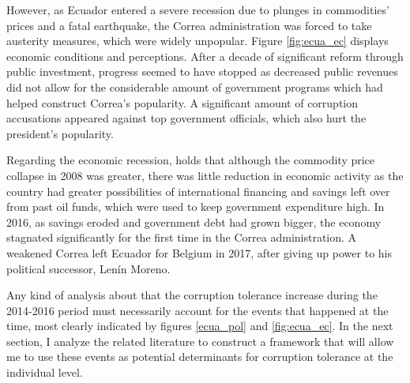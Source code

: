 \documentclass[12pt,a4]{article}\usepackage[]{graphicx}\usepackage[]{xcolor}
\begin{document}
However, as Ecuador entered a severe recession due to plunges in commodities’ prices and a fatal earthquake, the Correa administration was forced to take austerity measures, which were widely unpopular. Figure \ref{fig:ecua_ec} displays economic conditions and perceptions. After a decade of significant reform through public investment, progress seemed to have stopped as decreased public revenues did not allow for the considerable amount of government programs which had helped construct Correa's popularity. A significant amount of corruption accusations appeared against top government officials, which also hurt the president's popularity.

Regarding the economic recession, \textcite{Orozco.2015} holds that although the commodity price collapse in 2008 was greater, there was little reduction in economic activity as the country had greater possibilities of international financing and savings left over from past oil funds, which were used to keep government expenditure high. In 2016, as savings eroded and government debt had grown bigger, the economy stagnated significantly for the first time in the Correa administration. A weakened Correa left Ecuador for Belgium in 2017, after giving up power to his political successor, Lenín Moreno.

Any kind of analysis about that the corruption tolerance increase during the 2014-2016 period must necessarily account for the events that happened at the time, most clearly indicated by figures \ref{ecua_pol} and \ref{fig:ecua_ec}. In the next section, I analyze the related literature to construct a framework that will allow me to use these events as potential determinants for corruption tolerance at the individual level. 

\end{document}
